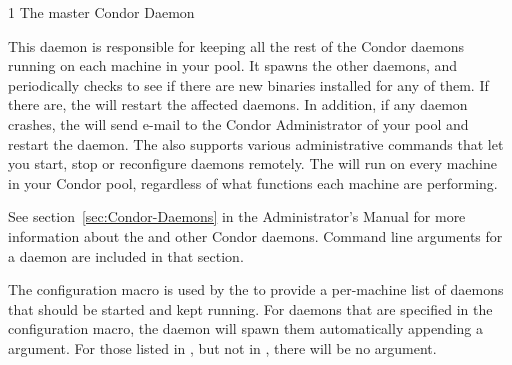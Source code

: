 \begin{ManPage}{\label{man-condor-master}}{1}
{The master Condor Daemon}

\Synopsis {}


\Description 

This daemon is responsible for keeping all the
rest of the Condor daemons running on each machine in your pool.  It  
spawns the other daemons, and periodically checks to see if there are
new binaries installed for any of them.  If there are,
the  will restart the affected daemons.
In addition, if any daemon crashes, the
 will send e-mail to the Condor Administrator of your pool and 
restart the daemon.  The  also supports various
administrative commands that let you start, stop or reconfigure
daemons remotely.  The  will run on every machine in 
your Condor pool, regardless of what functions each machine are
performing.

See section~\ref{sec:Condor-Daemons} in the Administrator's Manual
for more information
about the  and other Condor daemons.
Command line arguments for a  daemon are included
in that section.

The  configuration macro is used by the
 to provide a per-machine list of daemons that
should be started and kept running.
For daemons that are specified in the 
configuration macro,
the  daemon will spawn them automatically
appending a  argument.
For those listed in , but not in ,
there will be no  argument.

\end{ManPage}
